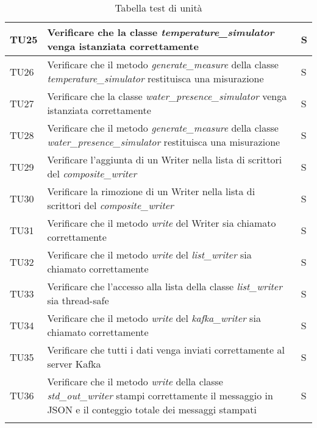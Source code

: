 \begin{longtable}{|C{1.9cm}|L{7cm}|C{2cm}|}
    TU25 & Verificare che la classe \textit{temperature\_simulator} venga istanziata correttamente & S \\
    \hline

    TU26 & Verificare che il metodo \textit{generate\_measure} della classe \textit{temperature\_simulator} restituisca una misurazione & S \\
    \hline

    TU27 & Verificare che la classe \textit{water\_presence\_simulator} venga istanziata correttamente & S \\
    \hline

    TU28 & Verificare che il metodo \textit{generate\_measure} della classe \textit{water\_presence\_simulator} restituisca una misurazione & S \\
    \hline

    TU29 & Verificare l'aggiunta di un Writer nella lista di scrittori del \textit{composite\_writer} & S \\   
    \hline

    TU30 & Verificare la rimozione di un Writer nella lista di scrittori del \textit{composite\_writer} & S \\
    \hline

    TU31 & Verificare che il metodo \textit{write} del Writer sia chiamato correttamente & S \\
    \hline

    TU32 & Verificare che il metodo \textit{write} del \textit{list\_writer} sia chiamato correttamente & S \\
    \hline

    TU33 & Verificare che l'accesso alla lista della classe \textit{list\_writer} sia thread-safe & S \\
    \hline

    TU34 & Verificare che il metodo \textit{write} del \textit{kafka\_writer} sia chiamato correttamente & S \\
    \hline

    TU35 & Verificare che tutti i dati venga inviati correttamente al server Kafka & S \\
    \hline

    TU36 & Verificare che il metodo \textit{write} della classe \textit{std\_out\_writer} stampi correttamente il messaggio in JSON e il conteggio totale dei messaggi stampati & S \\ 
    \hline


    \caption{Tabella test di unità}
\end{longtable}
